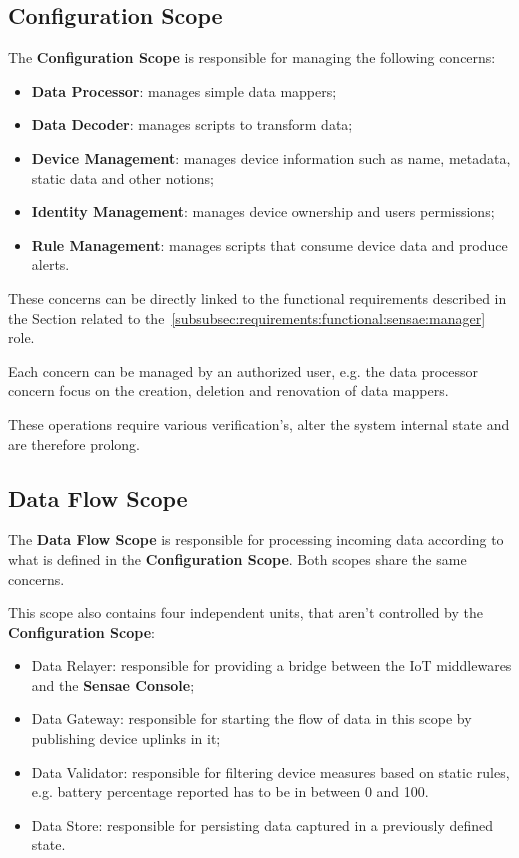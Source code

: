 \subsection{Configuration Scope}
\label{subsec:design:system_scopes:configuration_scope}

The \textbf{Configuration Scope} is responsible for managing the following concerns:

\begin{itemize}
   \item \textbf{Data Processor}: manages simple data mappers;
   \item \textbf{Data Decoder}: manages scripts to transform data;
   \item \textbf{Device Management}: manages device information such as name, metadata, static data and other notions;
   \item \textbf{Identity Management}: manages device ownership and users permissions;
   \item \textbf{Rule Management}: manages scripts that consume device data and produce alerts.
\end{itemize}

These concerns can be directly linked to the functional requirements described in the Section related to the~\ref{subsubsec:requirements:functional:sensae:manager} role.

Each concern can be managed by an authorized user, e.g. the data processor concern focus on the creation, deletion and renovation of data mappers.

These operations require various verification's, alter the system internal state and are therefore prolong.

\subsection{Data Flow Scope}
\label{subsec:design:system_scopes:data_flow_scope}

The \textbf{Data Flow Scope} is responsible for processing incoming data according to what is defined in the \textbf{Configuration Scope}. Both scopes share the same concerns.

This scope also contains four independent units, that aren't controlled by the \textbf{Configuration Scope}:

\begin{itemize}
   \item Data Relayer: responsible for providing a bridge between the \gls{IoT} middlewares and the \textbf{Sensae Console};
   \item Data Gateway: responsible for starting the flow of data in this scope by publishing device uplinks in it;
   \item Data Validator: responsible for filtering device measures based on static rules, e.g. battery percentage reported has to be in between 0 and 100.
   \item Data Store: responsible for persisting data captured in a previously defined state.
\end{itemize}

